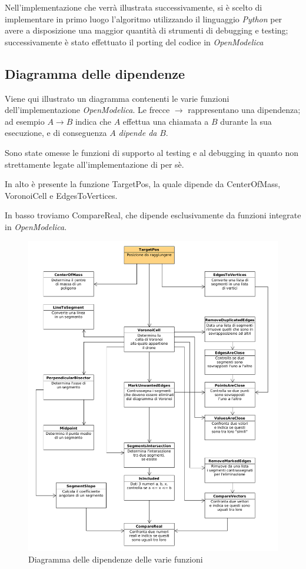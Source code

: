 \documentclass[10pt,a4paper]{article}
\newcommand{\name}[1]{{\color{purple}#1}}
\begin{document}
Nell'implementazione che verrà illustrata successivamente, si è scelto di implementare in primo luogo l'algoritmo utilizzando il linguaggio \textit{Python} per avere a disposizione una maggior quantità di strumenti di debugging e testing; successivamente è stato effettuato il porting del codice in \textit{OpenModelica}

\subsection{Diagramma delle dipendenze}

Viene qui illustrato un diagramma contenenti le varie funzioni dell'implementazione \textit{OpenModelica}. Le frecce $\longrightarrow$ rappresentano una dipendenza; ad esempio $A \longrightarrow B$ indica che $A$ effettua una chiamata a $B$ durante la sua esecuzione, e di conseguenza $A$ \textit{dipende da} $B$.

Sono state omesse le funzioni di supporto al testing e al debugging in quanto non strettamente legate all'implementazione di per sè.

In alto è presente la funzione \name{TargetPos}, la quale dipende da \name{CenterOfMass}, \name{VoronoiCell} e \name{EdgesToVertices}.

In basso troviamo \name{CompareReal}, che dipende esclusivamente da funzioni integrate in \textit{OpenModelica}.

\begin{figure}[H]
\includegraphics[width=15cm]{uml_diagram/uml_diagram_lloyd.png}
\centering
\caption{Diagramma delle dipendenze delle varie funzioni}
\end{figure}
\end{document}
